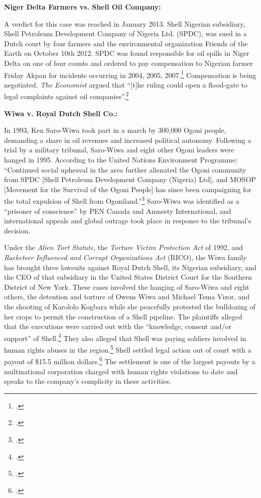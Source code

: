 \textbf{Niger Delta Farmers vs. Shell Oil Company:} 



A verdict for this case was reached in January 2013. 
Shell Nigerian subsidiary, Shell Petroleum Development Company of Nigeria Ltd. (SPDC), was sued in a Dutch court by four farmers and the environmental organization Friends of the Earth on October 10th 2012. 
SPDC was found responsible for oil spills in Niger Delta on one of four counts and ordered to pay compensation to Nigerian farmer Friday Akpan for incidents occurring in 2004, 2005, 2007.\footcite{OrderedFarmer}
Compensation is being negotiated. 
\emph{The Economist} argued that ``[t]he ruling could open a flood-gate to legal complaints against oil companies''.\footcite{MixedVerdict}



\textbf{Wiwa v. Royal Dutch Shell Co.:}



In 1993, Ken Saro-Wiwa took part in a march by 300,000 Ogoni people, demanding a share in oil revenues and increased political autonomy.
Following a trial by a military tribunal, Saro-Wiwa and eight other Ogoni leaders were hanged in 1995.
According to the United Nations Environment Programme: ``Continued social upheaval in the area further alienated the Ogoni community from SPDC [Shell Petroleum Development Company (Nigeria) Ltd], and MOSOP [Movement for the Survival of the Ogoni People] has since been campaigning for the total expulsion of Shell from Ogoniland.''\footcite[][p.27]{Ogoniland}
Saro-Wiwa was identified as a ``prisoner of conscience'' by PEN Canada and Amnesty International, and international appeals and global outrage took place in response to the tribunal's decision.



Under the \emph{Alien Tort Statute}, the \emph{Torture Victim Protection Act} of 1992, and \emph{Racketeer Influenced and Corrupt Organizations Act} (RICO), the Wiwa family has brought three lawsuits against Royal Dutch Shell, its Nigerian subsidiary, and the CEO of that subsidiary in the United States District Court for the Southern District of New York.
These cases involved the hanging of Saro-Wiwa and eight others, the detention and torture of Owens Wiwa and Michael Tema Vizor, and the shooting of Karololo Kogbara while she peacefully protested the bulldozing of her crops to permit the construction of a Shell pipeline.
The plaintiffs alleged that the executions were carried out with the ``knowledge, consent and/or support'' of Shell.\footcite{ShellTrialDelayed}
They also alleged that Shell was paying soldiers involved in human rights abuses in the region.\footcite{Shell15Million}
Shell settled legal action out of court with a payout of \$15.5 million dollars.\footcite{Shell15Million}
The settlement is one of the largest payouts by a multinational corporation charged with human rights violations to date and speaks to the company's complicity in these activities.



